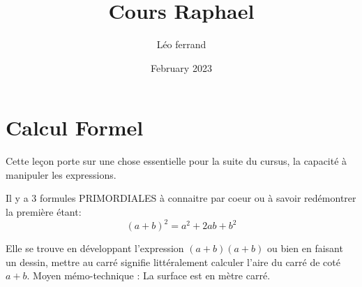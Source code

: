 \documentclass{article}
\title{Cours Raphael}
\author{Léo ferrand}
\date{February 2023}
\begin{document}
\maketitle

\section{Calcul Formel}
Cette leçon porte sur une chose essentielle pour la suite du cursus, la capacité à manipuler les expressions.

Il y a 3 formules PRIMORDIALES à connaitre par coeur ou à savoir redémontrer la première étant:
\[ (a+b)^2 = a^2 +2ab +b^2\]

Elle se trouve en développant l'expression $(a+b)(a+b)$ ou bien en faisant un dessin, mettre au carré signifie littéralement calculer l'aire du carré de coté $a + b$. Moyen mémo-technique : La surface est en mètre carré.
\begin{center}
\end{center}
\end{document}
